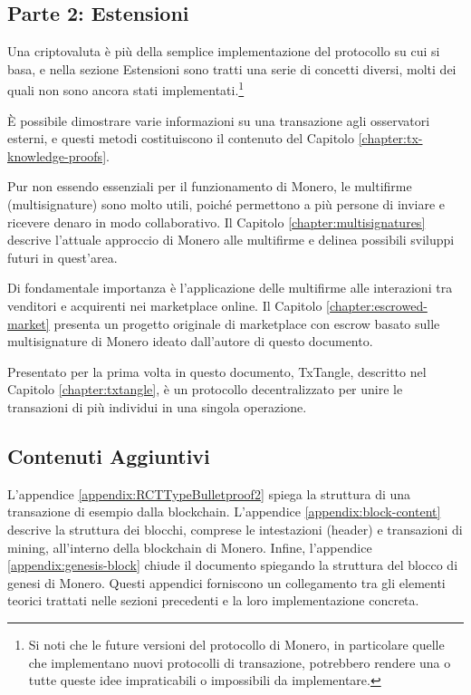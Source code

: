 \subsection{Parte 2: Estensioni}

Una criptovaluta è più della semplice implementazione del protocollo su cui si basa, e nella sezione Estensioni sono tratti una serie di concetti diversi, molti dei quali non sono ancora stati implementati.\footnote{Si noti che le future versioni del protocollo di Monero, in particolare quelle che implementano nuovi protocolli di transazione, potrebbero rendere una o tutte queste idee impraticabili o impossibili da implementare.}

È possibile dimostrare varie informazioni su una transazione agli osservatori esterni, e questi metodi costituiscono il contenuto del Capitolo \ref{chapter:tx-knowledge-proofs}.

Pur non essendo essenziali per il funzionamento di Monero, le multifirme (multisignature) sono molto utili, poiché permettono a più persone di inviare e ricevere denaro in modo collaborativo. Il Capitolo \ref{chapter:multisignatures} descrive l’attuale approccio di Monero alle multifirme e delinea possibili sviluppi futuri in quest’area.%

Di fondamentale importanza è l’applicazione delle multifirme alle interazioni tra venditori e acquirenti nei marketplace online. Il Capitolo \ref{chapter:escrowed-market} presenta un progetto originale di marketplace con escrow basato sulle multisignature di Monero ideato dall'autore di questo documento.

Presentato per la prima volta in questo documento, TxTangle, descritto nel Capitolo \ref{chapter:txtangle}, è un protocollo decentralizzato per unire le transazioni di più individui in una singola operazione.


\subsection{Contenuti Aggiuntivi}

L'appendice \ref{appendix:RCTTypeBulletproof2} spiega la struttura di una transazione di esempio dalla blockchain. L'appendice \ref{appendix:block-content} descrive la struttura dei blocchi, comprese le intestazioni (header) e transazioni di mining, all’interno della blockchain di Monero. Infine, l'appendice \ref{appendix:genesis-block} chiude il documento spiegando la struttura del blocco di genesi di Monero. Questi appendici forniscono un collegamento tra gli elementi teorici trattati nelle sezioni precedenti e la loro implementazione concreta.

